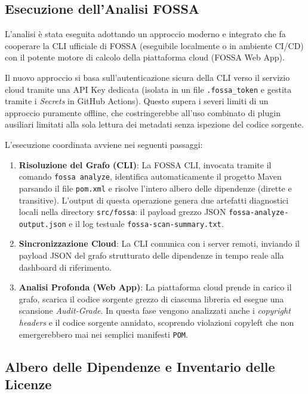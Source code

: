 \subsection{Esecuzione dell'Analisi FOSSA}

L'analisi è stata eseguita adottando un approccio moderno e integrato che fa cooperare la CLI ufficiale di FOSSA (eseguibile localmente o in ambiente CI/CD) con il potente motore di calcolo della piattaforma cloud (FOSSA Web App).

Il nuovo approccio si basa sull'autenticazione sicura della CLI verso il servizio cloud tramite una API Key dedicata (isolata in un file \texttt{.fossa\_token} e gestita tramite i \textit{Secrets} in GitHub Actions). Questo supera i severi limiti di un approccio puramente offline, che costringerebbe all'uso combinato di plugin ausiliari limitati alla sola lettura dei metadati senza ispezione del codice sorgente.

L'esecuzione coordinata avviene nei seguenti passaggi:
\begin{enumerate}
    \item \textbf{Risoluzione del Grafo (CLI)}: La FOSSA CLI, invocata tramite il comando \texttt{fossa analyze}, identifica automaticamente il progetto Maven parsando il file \texttt{pom.xml} e risolve l'intero albero delle dipendenze (dirette e transitive). L'output di questa operazione genera due artefatti diagnostici locali nella directory \texttt{src/fossa}: il payload grezzo JSON \texttt{fossa-analyze-output.json} e il log testuale \texttt{fossa-scan-summary.txt}.
    \item \textbf{Sincronizzazione Cloud}: La CLI comunica con i server remoti, inviando il payload JSON del grafo strutturato delle dipendenze in tempo reale alla dashboard di riferimento.
    \item \textbf{Analisi Profonda (Web App)}: La piattaforma cloud prende in carico il grafo, scarica il codice sorgente grezzo di ciascuna libreria ed esegue una scansione \textit{Audit-Grade}. In questa fase vengono analizzati anche i \textit{copyright headers} e il codice sorgente annidato, scoprendo violazioni copyleft che non emergerebbero mai nei semplici manifesti \texttt{POM}.
\end{enumerate}

\subsection{Albero delle Dipendenze e Inventario delle Licenze}

